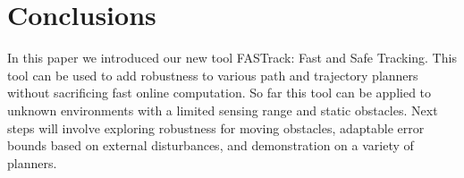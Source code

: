 \section{Conclusions}
In this paper we introduced our new tool FASTrack: Fast and Safe Tracking. This tool can be used to add robustness to various path and trajectory planners without sacrificing fast online computation. So far this tool can be applied to unknown environments with a limited sensing range and static obstacles. Next steps will involve exploring robustness for moving obstacles, adaptable error bounds based on external disturbances, and demonstration on a variety of planners.